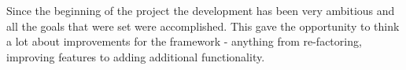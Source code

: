 Since the beginning of the project the development has been very ambitious and all
the goals that were set were accomplished. This gave the opportunity to think a lot about
improvements for the framework - anything from re-factoring, improving features to adding
additional functionality.